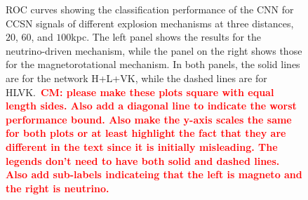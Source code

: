 \documentclass[aps,twocolumn,showpacs,groupedaddress, nofootinbib]{revtex4}  %
\newcommand{\cm}[1]{\textbf{\textcolor{red}{CM: #1}}}
\begin{document}
\begin{figure}
     \begin{center}
        \quad
    \end{center}
    \caption{\ac{ROC} curves showing the classification performance of the
\ac{CNN} for \ac{CCSN} signals of different explosion mechanisms at three
distances, $20$, $60$, and $100$kpc. The left panel shows the results for the
neutrino-driven mechanism, while the panel on the right shows those for the
magnetorotational mechanism. In both panels, the solid lines are for the
network H+L+VK, while the dashed lines are for HLVK.~\cm{please make these
plots square with equal length sides. Also add a diagonal line to indicate the
worst performance bound. Also make the y-axis scales the same for both plots or
at least highlight the fact that they are different in the text since it is
initially misleading. The legends don't need to have both solid and dashed
lines. Also add sub-labels indicateing that the left is magneto and the right
is neutrino.}\label{fig:ROClog}} 
\end{figure}
\end{document}
